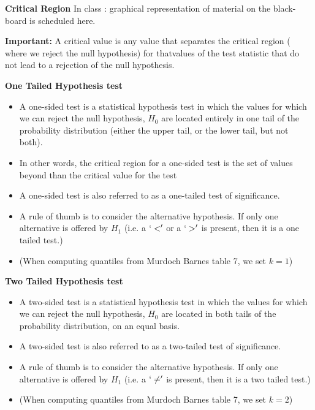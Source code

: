 \documentclass[a4]{beamer}
\begin{document}
\noindent \textbf{Critical Region}
In class : graphical representation of material on the black-board is scheduled here.



\textbf{Important:}
A critical value is any value that separates the critical region ( where we reject the null hypothesis) for thatvalues of the test statistic that do not lead to a rejection of the null hypothesis.




\noindent \textbf{One Tailed Hypothesis test}
\begin{itemize}
\item A one-sided test is a statistical hypothesis test in which the values for which we can reject the null hypothesis, $H_0$ are located entirely in one tail of the probability distribution (either the upper tail, or the lower tail, but not both).

\item In other words, the critical region for a one-sided test is the set of values beyond than the critical value for the test

\item A one-sided test is also referred to as a one-tailed test of significance.

\item A rule of thumb is to consider the alternative hypothesis.  If only one alternative is offered by $H_1$ (i.e. a $`<'$ or a $`>'$ is present, then it is a one tailed test.)
\item (When computing quantiles from Murdoch Barnes table 7, we set $k=1$)
\end{itemize}




\noindent \textbf{Two Tailed Hypothesis test}
\begin{itemize}
\item
A two-sided test is a statistical hypothesis test in which the values for which we can reject the null hypothesis, $H_0$ are located in both tails of the probability distribution, on an equal basis.

\item A two-sided test is also referred to as a two-tailed test of significance.
\item A rule of thumb is to consider the alternative hypothesis.  If only one alternative is offered by $H_1$ (i.e. a $`\neq'$ is present, then it is a two tailed test.)
\item (When computing quantiles from Murdoch Barnes table 7, we set $k=2$)

\end{itemize}
\end{document}
